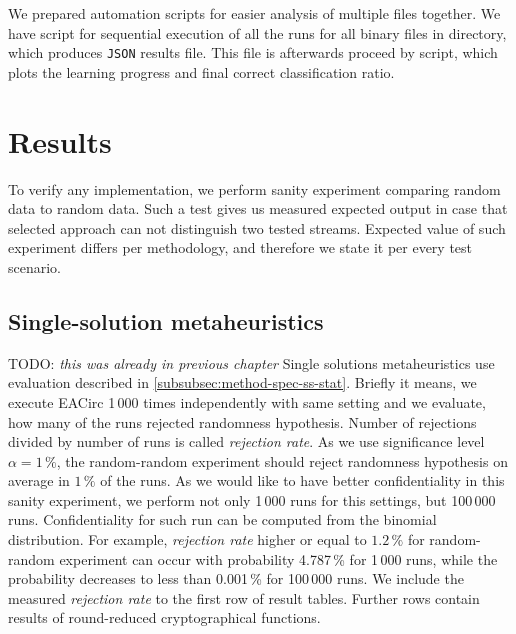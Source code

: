 \documentclass[
  print, %
  Table,   %
  nolof,     %
  nolot,     %
  11pt, %
  oneside  %
]{fithesis3}
\newcommand{\todo}[1]{TODO: \textit{#1}}
\begin{document}
We prepared automation scripts for easier analysis of multiple files together. We have script for sequential execution of all the runs for all binary files in directory, which produces \texttt{JSON} results file. This file is afterwards proceed by script, which plots the learning progress and final correct classification ratio.


\chapter{Results}
\label{chap:res}

To verify any implementation, we perform sanity experiment comparing random data to random data. Such a test gives us measured expected output in case that selected approach can not distinguish two tested streams. Expected value of such experiment differs per methodology, and therefore we state it per every test scenario.

\section{Single-solution metaheuristics}
\label{sec:res-ss}

\todo{this was already in previous chapter}
Single solutions metaheuristics use evaluation described in \cref{subsubsec:method-spec-ss-stat}. Briefly it means, we execute EACirc 1\,000 times independently with same setting and we evaluate, how many of the runs rejected randomness hypothesis. Number of rejections divided by number of runs is called \textit{rejection rate}. As we use significance level $\alpha=1\,\%$, the random-random experiment should reject randomness hypothesis on average in $1\,\%$ of the runs. As we would like to have better confidentiality in this sanity experiment, we perform not only 1\,000 runs for this settings, but 100\,000 runs. Confidentiality for such run can be computed from the binomial distribution. For example, \textit{rejection rate} higher or equal to $1.2\,\%$ for random-random experiment can occur with probability 4.787\,\% for 1\,000 runs, while the probability decreases to less than 0.001\,\% for 100\,000 runs. We include the measured \textit{rejection rate} to the first row of result tables. Further rows contain results of round-reduced cryptographical functions.
\end{document}
